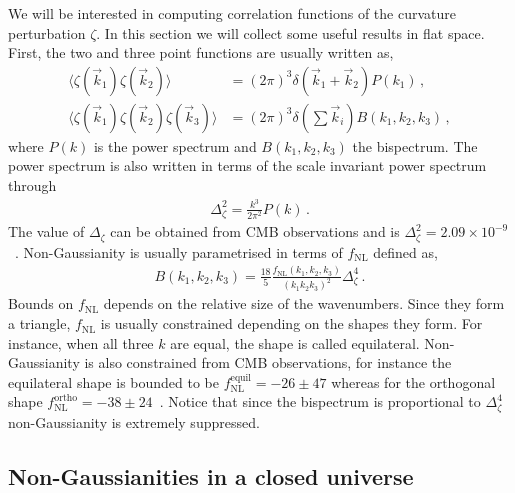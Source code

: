 \documentclass[a4paper,11pt]{article}
\numberwithin{equation}{section}
\def\k{{\vec{k}}}
\numberwithin{equation}{section}
\begin{document}
We will be interested in computing correlation functions  of the curvature perturbation $\zeta$. In this section we will collect some useful results in flat space. First, the two and three point functions are usually written as,
\begin{align}
\langle\zeta(\k_1)\zeta(\k_2)\rangle&=(2\pi)^3\delta(\k_1+\k_2)P(k_1) \,, \label{eq:PowerSpectrumFlat}\\
\langle\zeta(\k_1)\zeta(\k_2)\zeta(\k_3)\rangle&=(2\pi)^3\delta\left(\sum \k_i\right)B(k_1,k_2,k_3) \label{eq:BispectrumFlat}\,,
\end{align}
where $P(k)$ is the power spectrum and  $B(k_1,k_2,k_3)$ the bispectrum. The power spectrum is also written in terms of the scale invariant power spectrum through
\begin{align}
\Delta_\zeta^2=\frac{k^3}{2\pi^2}P(k) \,.
\end{align}
The value of $\Delta_\zeta$ can be obtained from  CMB observations  and is  $\Delta_\zeta^2= 2.09\times 10^{-9}$~\cite{Planck:2018jri}.
Non-Gaussianity is usually parametrised in terms of $f_{\mathrm{NL}}$ defined as,
\begin{align}
B(k_1,k_2,k_3)=\frac{18}{5}\frac{f_{\mathrm{NL}}(k_1,k_2,k_3)}{(k_1 k_2 k_3)^2}\Delta_\zeta^4 \,.
\end{align}
Bounds on $f_\mathrm{{NL}}$ depends on  the relative size of the wavenumbers. Since  they form a triangle, $f_\mathrm{{NL}}$  is usually constrained depending on the shapes they form. For instance, when all three $k$ are equal, the shape is called equilateral. Non-Gaussianity is also constrained from CMB observations, for instance the equilateral shape is bounded to be  $f_{\mathrm{NL}}^{\mathrm{equil}}=-26\pm 47$ whereas for the orthogonal shape $f_{\mathrm{NL}}^{\mathrm{ortho}}=-38\pm 24$~\cite{Planck:2019kim}. Notice that since the bispectrum is proportional to $\Delta_\zeta^4$ non-Gaussianity is extremely suppressed. 


\subsection{Non-Gaussianities in a closed universe}
\end{document}
